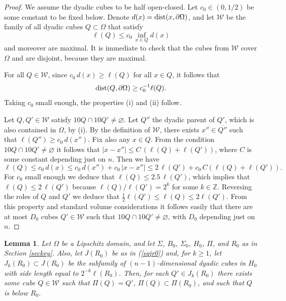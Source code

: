 \documentclass[11pt]{amsart}
\newcommand{\Z}{{\mathbb Z}}       %
\newcommand{\WW}{{\mathcal W}}
\newcommand{\dist}{{\rm dist}}
\newcommand{\rf}[1]{{(\ref{#1})}}
\newcommand{\vv}{{\vspace{2mm}}}
\newtheorem{lemma}[theorem]{Lemma}
\theoremstyle{definition}
\theoremstyle{remark}
\numberwithin{equation}{section}
\begin{document}
\begin{proof}
We assume the dyadic cubes to be half open-closed.
Let $c_0\in(0,1/2)$ be some constant to be fixed below. Denote $d(x)  =\dist(x,\partial\Omega)$, and 
let $\WW$ be the family of all dyadic cubes $Q\subset\Omega$ that satisfy
\begin{equation}\label{eqlqdx}
\ell(Q)\leq c_0\,\inf_{x\in Q} d(x)
\end{equation}
and moreover are maximal. It is immediate to check that the cubes from $\WW$ cover
$\Omega$ and are disjoint, because they are maximal.

For all $Q\in\WW$, since $c_0\,d(x)\geq\ell(Q)$ for all $x\in Q$, it follows that $$\dist(Q,\partial
\Omega)\geq c_0^{-1}\ell(Q).$$
Taking $c_0$ small enough, the properties (i) and (ii) follow.

Let $Q,Q'\in\WW$ satisfy $10Q\cap10Q'\neq\varnothing$. Let $Q''$ the dyadic parent of $Q'$, which
is also contained in $\Omega$, by (i). By the definition of $\WW$, there exists $x''\in \overline{Q''}$ such that 
$\ell(Q'')\geq c_0\, d(x'')$. Fix also any $x\in Q$. From the condition $10Q\cap10Q'\neq\varnothing$ it follows that $|x-x''|\leq C\,(\ell(Q)+\ell(Q'))$, where $C$ is some constant depending just on $n$.
Then we have
$$\ell(Q)\leq c_0\,d(x) \leq c_0\,d(x'') + c_0\,|x-x''|\leq 2\,\ell(Q') + c_0\,C(\ell(Q) + \ell(Q')).$$
For $c_0$ small enough we deduce that $\ell(Q)\leq 2.5\,\ell(Q')$, which implies that 
$\ell(Q)\leq 2\,\ell(Q')$ because $\ell(Q)/\ell(Q')=2^k$ for some $k\in\Z$. Reversing the roles of $Q$ and $Q'$ we deduce that $\frac12\ell(Q')\leq \ell(Q)\leq 2\ell(Q')$.
From this property and standard volume considerations it follows easily that there are at most $D_0$ cubes $Q'\in\WW$
such that $10Q \cap 10Q' \neq \varnothing$, with $D_0$ depending just on $n$.
\end{proof}

\vv

\begin{lemma}\label{lemwhit2}
Let $\Omega$ be a Lipschitz domain, and let $\Sigma$, $B_0$, $\Sigma_0$, $H_0$, $\Pi$, and $R_0$ as in 
Section \ref{seckey}.
Also, let $J(R_0)$ be as in \rf{eqjr0} and, for $k\geq1$, let $J_k(R_0)\subset J(R_0)$ be the subfamily of $(n-1)$-dimensional dyadic cubes in $H_0$ with side length equal to $2^{-k}\ell(R_0)$.
Then, for each $Q'\in J_k(R_0)$ there exists some cube $Q\in\WW$ such that $\Pi(Q)=Q'$, $\Pi(Q)\subset \Pi(R_0)$, and such that $Q$ is below $R_0$.
\end{lemma}
\end{document}
